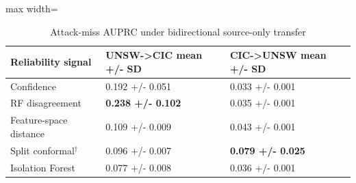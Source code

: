 \documentclass[conference]{IEEEtran}
\begin{document}
\begin{table}[t]
\centering
\caption{Attack-miss AUPRC under bidirectional source-only transfer}
\begin{adjustbox}{max width=\columnwidth}
\begin{tabular}{lll}
\toprule
\textbf{Reliability signal} & \textbf{UNSW->CIC mean +/- SD} & \textbf{CIC->UNSW mean +/- SD} \\
\midrule
Confidence & 0.192 +/- 0.051 & 0.033 +/- 0.001 \\
RF disagreement & \textbf{0.238 +/- 0.102} & 0.035 +/- 0.001 \\
Feature-space distance & 0.109 +/- 0.009 & 0.043 +/- 0.001 \\
Split conformal$^\dagger$ & 0.096 +/- 0.007 & \textbf{0.079 +/- 0.025} \\
Isolation Forest & 0.077 +/- 0.008 & 0.036 +/- 0.001 \\
\bottomrule
\end{tabular}
\end{adjustbox}
\end{table}
\end{document}
